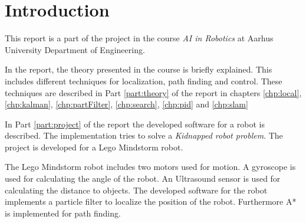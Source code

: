 \chapter{Introduction}
\label{chp:intro}

This report is a part of the project in the course \emph{AI in Robotics} at Aarhus University Department of Engineering.

In the report, the theory presented in the course is briefly explained. This includes different techniques for localization, path finding and control. These techniques are described in Part \ref{part:theory} of the report in chapters \ref{chp:local}, \ref{chp:kalman}, \ref{chp:partFilter}, \ref{chp:search}, \ref{chp:pid} and \ref{chp:slam}

In Part \ref{part:project} of the report the developed software for a robot is described. The implementation tries to solve a \emph{Kidnapped robot problem}. The project is developed for a Lego Mindstorm robot.

The Lego Mindstorm robot includes two motors used for motion. A gyroscope is used for calculating the angle of the robot. An Ultrasound sensor is used for calculating the distance to objects. The developed software for the robot implements a particle filter to localize the position of the robot. Furthermore A* is implemented for path finding.